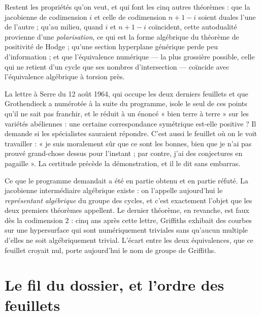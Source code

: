 \documentclass[11pt,a4paper]{article}
\begin{document}
\begin{resume}
Restent les propriétés qu'on veut, et qui font les cinq autres théorèmes : que
la jacobienne de codimension $i$ et celle de codimension $n+1-i$ soient duales
l'une de l'autre ; qu'au milieu, quand $i$ et $n+1-i$ coïncident, cette
autodualité provienne d'une \emph{polarisation}, ce qui est la forme
algébrique du théorème de positivité de Hodge ; qu'une section hyperplane
générique perde peu d'information ; et que l'équivalence numérique — la plus
grossière possible, celle qui ne retient d'un cycle que ses nombres
d'intersection — coïncide avec l'équivalence algébrique à torsion près.

La lettre à Serre du 12 août 1964, qui occupe les deux derniers feuillets et
que Grothendieck a numérotée à la suite du programme, isole le seul de ces
points qu'il ne sait pas franchir, et le réduit à un énoncé « bien terre à
terre » sur les variétés abéliennes : une certaine correspondance symétrique
est-elle positive ? Il demande si les spécialistes sauraient répondre. C'est
aussi le feuillet où on le voit travailler : « je suis moralement sûr que ce
sont les bonnes, bien que je n'ai pas prouvé grand-chose dessus pour
l'instant ; par contre, j'ai des conjectures en pagaille ». La certitude
précède la démonstration, et il le dit sans embarras.

Ce que le programme demandait a été en partie obtenu et en partie réfuté. La
jacobienne intermédiaire algébrique existe : on l'appelle aujourd'hui le
\emph{représentant algébrique} du groupe des cycles, et c'est exactement l'objet
que les deux premiers théorèmes appellent. Le dernier théorème, en revanche,
est faux dès la codimension $2$ : cinq ans après cette lettre, Griffiths
exhibait des courbes sur une hypersurface qui sont numériquement triviales sans
qu'aucun multiple d'elles ne soit algébriquement trivial. L'écart entre les
deux équivalences, que ce feuillet croyait nul, porte aujourd'hui le nom de
groupe de Griffiths.

\end{resume}

\section*{Le fil du dossier, et l'ordre des feuillets}
\end{document}
